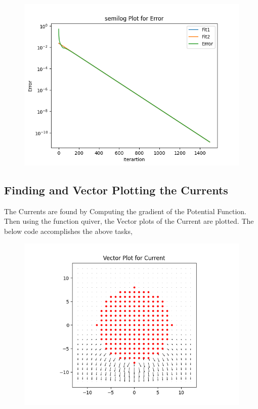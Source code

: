 \documentclass[12pt, a4paper]{report}
\begin{document}
\begin{figure}[h!]
    \centering
    \includegraphics[scale=0.75]{fig4.png} 
    \caption{}
    \label{fig:my_label}
\end{figure}
\vspace{100mm}
\vspace{100mm}

\subsection{Finding and Vector Plotting the Currents}
The Currents are found by Computing the gradient of the Potential Function. Then using the function quiver, the Vector plots of the Current are plotted. The below code accomplishes the above tasks,
\noindent
\vspace{5mm}

\begin{figure}[h!]
    \centering
    \includegraphics[scale=0.68]{fig6.png} 
    \caption{}
    \label{fig:my_label}
\end{figure}
\end{document}
